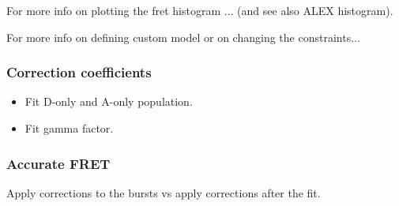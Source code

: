 For more info on plotting the fret histogram ... (and see also ALEX histogram).

For more info on defining custom model or on changing the constraints...


\subsubsection{Correction coefficients}


\begin{itemize}
\item Fit D-only and A-only population.
\item Fit gamma factor.
\end{itemize}


\subsubsection{Accurate FRET}

Apply corrections to the bursts vs apply corrections after the fit.

